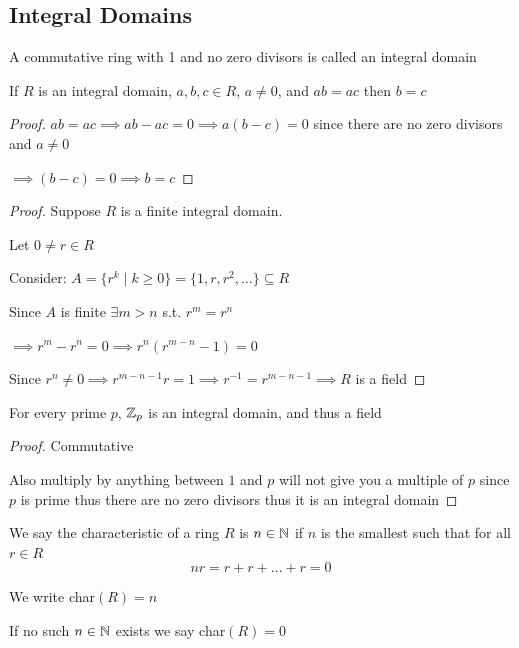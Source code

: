 \subsection{Integral Domains}

\begin{definition}
    A commutative ring with 1 and no zero divisors is
    called an integral domain
\end{definition}

\begin{proposition}
    If $R$ is an integral domain, $a,b,c\in R$, $a\neq 0$, and $ab=ac$
    then $b=c$
\end{proposition}

\begin{proof}
    $ab=ac \implies ab-ac=0 \implies a(b-c)=0$ since there are no zero
    divisors and $a\neq 0$ 
    
    $\implies (b-c)=0 \implies b=c$
\end{proof}


\begin{proof}
    Suppose $R$ is a finite integral domain.

    Let $0\neq r\in R$

    Consider: $A=\{r^k \mid k \geq 0\}=\{1,r,r^2,\dots\}\subseteq R$

    Since $A$ is finite $\exists m > n$ s.t. $r^m=r^n$

    $\implies r^m-r^n=0 \implies r^n(r^{m-n}-1)=0$

    Since $r^n \neq 0 \implies r^{m-n-1}r=1 \implies r^{-1}=r^{m-n-1} \implies R$ is a field
\end{proof}

\begin{example}
    For every prime $p$, $\mathbb{Z}_p$ is an integral domain, and thus a field
\end{example}
\begin{proof}
    Commutative \checkmark

    Also multiply by anything between $1$ and $p$ will not give you a multiple of $p$
    since $p$ is prime thus there are no zero divisors thus it is an integral domain
\end{proof}

\begin{definition}
    We say the characteristic of a ring $R$ is $n \in \mathbb{N}$ if $n$ is 
    the smallest such that for all $r\in R$ \[nr=r+r+\dots+r=0\]

    We write char$(R)=n$

    If no such $n\in\mathbb{N}$ exists we say char$(R)=0$
\end{definition}

